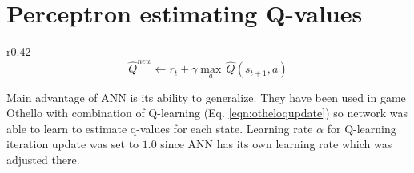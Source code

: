 \section{Perceptron estimating Q-values}
\begin{wrapfigure}{r}{0.42\textwidth}
  \vspace*{-0.95cm}
  \begin{equation}
    \label{eqn:otheloqupdate}
    \hat{Q}^{new}\!\leftarrow\!r_t\!+\!{\gamma}{\max_a}\,\hat{Q}(s_{t+1},\!a)
  \end{equation}
  \vspace*{-0.95cm}
\end{wrapfigure}

Main advantage of ANN is its ability to generalize. They have been used
in game Othello \cite{othello} with combination of Q-learning
(Eq. \ref{eqn:otheloqupdate}) so network was able to learn to estimate q-values
for each state. Learning rate $\alpha$ for Q-learning iteration update was
set to $1.0$ since ANN has its own learning rate which was adjusted there.

